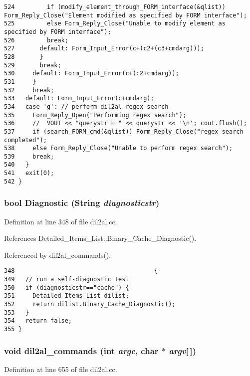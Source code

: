 \begin{verbatim}
524         if (modify_element_through_FORM_interface(&qlist)) Form_Reply_Close("Element modified as specified by FORM interface");
525         else Form_Reply_Close("Unable to modify element as specified by FORM interface");
526         break;
527       default: Form_Input_Error(c+(c2+(c3+cmdarg)));
528       }
529       break;
530     default: Form_Input_Error(c+(c2+cmdarg));
531     }
532     break;
533   default: Form_Input_Error(c+cmdarg);
534   case 'g': // perform dil2al regex search
535     Form_Reply_Open("Performing regex search");
536     //  VOUT << "querystr = " << querystr << '\n'; cout.flush();
537     if (search_FORM_cmd(&qlist)) Form_Reply_Close("regex search completed");
538     else Form_Reply_Close("Unable to perform regex search");
539     break;
540   }
541   exit(0);
542 }
\end{verbatim}\normalsize 
{}
\subsubsection{\setlength{\rightskip}{0pt plus 5cm}bool Diagnostic ({\bf String} {\em diagnosticstr})}\label{dil2al_8cc_a102}




Definition at line 348 of file dil2al.cc.

References Detailed\_\-Items\_\-List::Binary\_\-Cache\_\-Diagnostic().

Referenced by dil2al\_\-commands().



\footnotesize\begin{verbatim}348                                       {
349   // run a self-diagnostic test
350   if (diagnosticstr=="cache") {
351     Detailed_Items_List dilist;
352     return dilist.Binary_Cache_Diagnostic();
353   }
354   return false;
355 }
\end{verbatim}\normalsize 
{}
\subsubsection{\setlength{\rightskip}{0pt plus 5cm}void dil2al\_\-commands (int {\em argc}, char $\ast$ {\em argv}[$\,$])}\label{dil2al_8cc_a113}




Definition at line 655 of file dil2al.cc.

